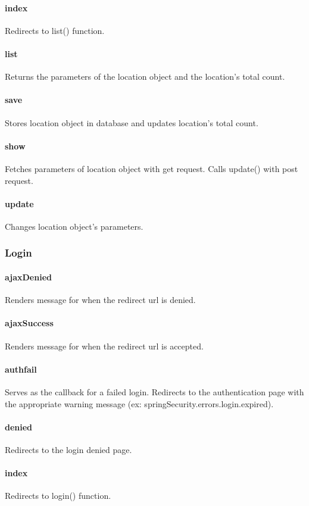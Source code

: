 \documentclass[12pt]{article}
\begin{document}
\paragraph{index} Redirects to list() function.
\paragraph{list} Returns the parameters of the location object and the location's total count.
\paragraph{save} Stores location object in database and updates location's total count.
\paragraph{show} Fetches parameters of location object with get request. Calls update() with post request.
\paragraph{update} Changes location object's parameters.

\subsubsection{Login}\label{sec:CLogin}
\paragraph{ajaxDenied} Renders message for when the redirect url is denied.
\paragraph{ajaxSuccess} Renders message for when the redirect url is accepted.
\paragraph{authfail} Serves as the callback for a failed login. Redirects to the authentication page with the appropriate warning message (ex: springSecurity.errors.login.expired).
\paragraph{denied} Redirects to the login denied page.
\paragraph{index} Redirects to login() function.
\end{document}
